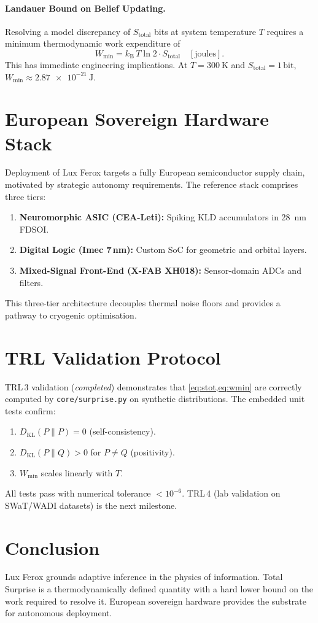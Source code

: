 \documentclass[11pt,a4paper,twocolumn]{article}
\newcommand{\DKL}{D_{\mathrm{KL}}}
\newcommand{\kB}{k_{\mathrm{B}}}
\newcommand{\Stot}{S_{\mathrm{total}}}
\newcommand{\Wmin}{W_{\min}}
\begin{document}
\paragraph{Landauer Bound on Belief Updating.}
Resolving a model discrepancy of $\Stot$ bits at system temperature $T$
requires a minimum thermodynamic work expenditure of
\begin{equation}
  \Wmin = \kB \, T \ln 2 \cdot \Stot \quad [\text{joules}].
  \label{eq:wmin}
\end{equation}
This has immediate engineering implications. At $T = \SI{300}{\kelvin}$ and
$\Stot = 1\,\text{bit}$, $\Wmin \approx \SI{2.87e-21}{\joule}$.

\section{European Sovereign Hardware Stack}
Deployment of Lux Ferox targets a fully European semiconductor supply
chain, motivated by strategic autonomy requirements. The reference stack
comprises three tiers:
\begin{enumerate}
    \item \textbf{Neuromorphic ASIC (CEA-Leti):} Spiking KLD accumulators in \SI{28}{\nano\metre} FDSOI.
    \item \textbf{Digital Logic (Imec 7\,nm):} Custom SoC for geometric and orbital layers.
    \item \textbf{Mixed-Signal Front-End (X-FAB XH018):} Sensor-domain ADCs and filters.
\end{enumerate}
This three-tier architecture decouples thermal noise floors and provides a
pathway to cryogenic optimisation.

\section{TRL Validation Protocol}
TRL\,3 validation (\textit{completed}) demonstrates that
\cref{eq:stot,eq:wmin} are correctly computed by \texttt{core/surprise.py}
on synthetic distributions. The embedded unit tests confirm:
\begin{enumerate}
  \item $\DKL(P\|P) = 0$ (self-consistency).
  \item $\DKL(P\|Q) > 0$ for $P \neq Q$ (positivity).
  \item $\Wmin$ scales linearly with $T$.
\end{enumerate}
All tests pass with numerical tolerance $< 10^{-6}$. TRL\,4 (lab validation
on SWaT/WADI datasets) is the next milestone.

\section{Conclusion}
Lux Ferox grounds adaptive inference in the physics of information. Total
Surprise is a thermodynamically defined quantity with a hard lower bound
on the work required to resolve it. European sovereign hardware provides
the substrate for autonomous deployment.



\end{document}
